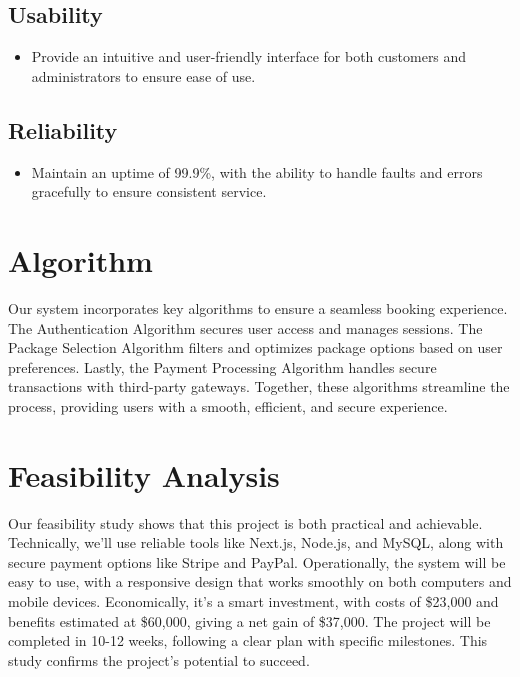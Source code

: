 \documentclass[12pt]{scrreprt}
\begin{document}
\subsection{Usability}
\begin{itemize}
    \item Provide an intuitive and user-friendly interface for both customers and administrators to ensure ease of use.
\end{itemize}

\subsection{Reliability}
\begin{itemize}
    \item Maintain an uptime of 99.9\%, with the ability to handle faults and errors gracefully to ensure consistent service.
\end{itemize}

\section{Algorithm}
Our system incorporates key algorithms to ensure a seamless booking experience. The Authentication Algorithm secures user access and manages sessions. The Package Selection Algorithm filters and optimizes package options based on user preferences. Lastly, the Payment Processing Algorithm handles secure transactions with third-party gateways. Together, these algorithms streamline the process, providing users with a smooth, efficient, and secure experience.

\section{Feasibility Analysis}
Our feasibility study shows that this project is both practical and achievable. Technically, we’ll use reliable tools like Next.js, Node.js, and MySQL, along with secure payment options like Stripe and PayPal. Operationally, the system will be easy to use, with a responsive design that works smoothly on both computers and mobile devices. Economically, it’s a smart investment, with costs of \$23,000 and benefits estimated at \$60,000, giving a net gain of \$37,000. The project will be completed in 10-12 weeks, following a clear plan with specific milestones. This study confirms the project’s potential to succeed.
\end{document}
